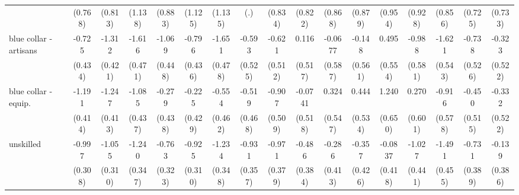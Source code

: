 {\begin{tabular}{l*{16}{c}}
                    &     (0.768)         &     (0.813)         &     (1.138)         &     (0.883)         &     (1.125)         &     (1.135)         &         (.)         &     (0.834)         &     (0.822)         &     (0.868)         &     (0.879)         &     (0.954)         &     (0.928)         &     (0.856)         &     (0.725)         &     (0.733)         \\
[1em]
blue collar - artisans&      -0.725         &      -1.312\sym{**} &      -1.616\sym{***}&      -1.069\sym{*}  &      -0.796         &      -1.651\sym{***}&      -0.593         &      -0.621         &       0.116         &     -0.0677         &      -0.148         &       0.495         &      -0.988         &      -1.621\sym{**} &      -0.738         &      -0.323         \\
                    &     (0.434)         &     (0.421)         &     (0.471)         &     (0.448)         &     (0.436)         &     (0.478)         &     (0.525)         &     (0.512)         &     (0.517)         &     (0.587)         &     (0.561)         &     (0.554)         &     (0.581)         &     (0.543)         &     (0.526)         &     (0.522)         \\
[1em]
blue collar - equip.&      -1.191\sym{**} &      -1.247\sym{**} &      -1.085\sym{*}  &      -0.279         &      -0.225         &      -0.554         &      -0.519         &      -0.907         &     -0.0741         &       0.324         &       0.444         &       1.240         &       0.270         &      -0.916         &      -0.450         &      -0.332         \\
                    &     (0.414)         &     (0.413)         &     (0.437)         &     (0.438)         &     (0.429)         &     (0.462)         &     (0.468)         &     (0.509)         &     (0.518)         &     (0.547)         &     (0.534)         &     (0.650)         &     (0.601)         &     (0.578)         &     (0.515)         &     (0.522)         \\
[1em]
unskilled           &      -0.997\sym{**} &      -1.055\sym{***}&      -1.240\sym{***}&      -0.763\sym{*}  &      -0.925\sym{**} &      -1.234\sym{***}&      -0.931\sym{**} &      -0.971\sym{*}  &      -0.486         &      -0.286         &      -0.357         &     -0.0837         &      -1.027\sym{*}  &      -1.491\sym{**} &      -0.731         &      -0.139         \\
                    &     (0.308)         &     (0.310)         &     (0.347)         &     (0.323)         &     (0.310)         &     (0.348)         &     (0.357)         &     (0.379)         &     (0.384)         &     (0.413)         &     (0.426)         &     (0.418)         &     (0.441)         &     (0.455)         &     (0.389)         &     (0.386)         \\

\end{tabular}}

